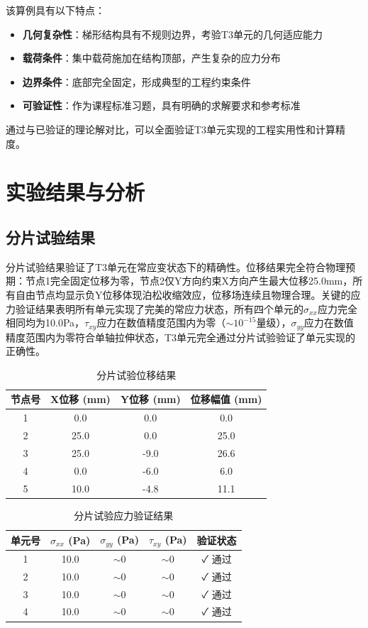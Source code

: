 \documentclass[12pt,a4paper]{article}
\begin{document}
该算例具有以下特点：
\begin{itemize}
    \item \textbf{几何复杂性}：梯形结构具有不规则边界，考验T3单元的几何适应能力
    \item \textbf{载荷条件}：集中载荷施加在结构顶部，产生复杂的应力分布
    \item \textbf{边界条件}：底部完全固定，形成典型的工程约束条件
    \item \textbf{可验证性}：作为课程标准习题，具有明确的求解要求和参考标准
\end{itemize}

通过与已验证的理论解对比，可以全面验证T3单元实现的工程实用性和计算精度。

\section{实验结果与分析}

\subsection{分片试验结果}

分片试验结果验证了T3单元在常应变状态下的精确性。位移结果完全符合物理预期：节点1完全固定位移为零，节点2仅Y方向约束X方向产生最大位移25.0mm，所有自由节点均显示负Y位移体现泊松收缩效应，位移场连续且物理合理。关键的应力验证结果表明所有单元实现了完美的常应力状态，所有四个单元的$\sigma_{xx}$应力完全相同均为10.0Pa，$\tau_{xy}$应力在数值精度范围内为零（$\sim 10^{-15}$量级），$\sigma_{yy}$应力在数值精度范围内为零符合单轴拉伸状态，T3单元完全通过分片试验验证了单元实现的正确性。

\begin{table}[H]
\centering
\caption{分片试验位移结果}
\begin{tabular}{cccc}
\toprule
节点号 & X位移 (mm) & Y位移 (mm) & 位移幅值 (mm) \\
\midrule
1 & 0.0 & 0.0 & 0.0 \\
2 & 25.0 & 0.0 & 25.0 \\
3 & 25.0 & -9.0 & 26.6 \\
4 & 0.0 & -6.0 & 6.0 \\
5 & 10.0 & -4.8 & 11.1 \\
\bottomrule
\end{tabular}
\end{table}

\begin{table}[H]
\centering
\caption{分片试验应力验证结果}
\begin{tabular}{ccccc}
\toprule
单元号 & $\sigma_{xx}$ (Pa) & $\sigma_{yy}$ (Pa) & $\tau_{xy}$ (Pa) & 验证状态 \\
\midrule
1 & 10.0 & $\sim$0 & $\sim$0 & ✓ 通过 \\
2 & 10.0 & $\sim$0 & $\sim$0 & ✓ 通过 \\
3 & 10.0 & $\sim$0 & $\sim$0 & ✓ 通过 \\
4 & 10.0 & $\sim$0 & $\sim$0 & ✓ 通过 \\
\bottomrule
\end{tabular}
\end{table}
\end{document}
